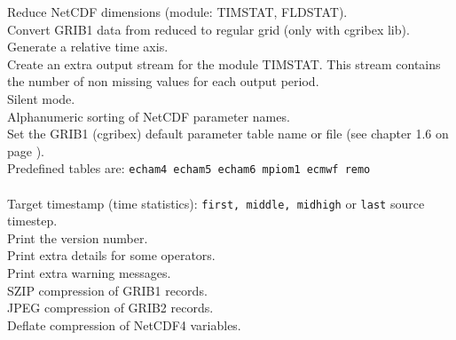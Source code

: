 \begin{tabbing}
         \> Reduce NetCDF dimensions (module: TIMSTAT, FLDSTAT). \\
         \> Convert GRIB1 data from reduced to regular grid (only with cgribex lib). \\
         \> Generate a relative time axis. \\
         \> Create an extra output stream for the module TIMSTAT. This stream contains  \\
         \> the number of non missing values for each output period. \\
         \> Silent mode. \\
         \> Alphanumeric sorting of NetCDF parameter names. \\
         \> Set the GRIB1 (cgribex) default parameter table name or file (see chapter 1.6 on page \pageref{PARAMETER_TABLE}).\\
         \> Predefined tables are:  {\tt echam4 echam5 echam6 mpiom1 ecmwf remo}\\
         \> \\
\makebox[1.5in][l]{\hspace*{1cm}}
         \> Target timestamp (time statistics): {\tt first, middle, midhigh} or {\tt last} source timestep. \\
         \> Print the version number. \\
         \> Print extra details for some operators. \\
         \> Print extra warning messages. \\
         \> SZIP compression of GRIB1 records. \\
         \> JPEG compression of GRIB2 records. \\
         \> Deflate compression of NetCDF4 variables. \\
\end{tabbing}

